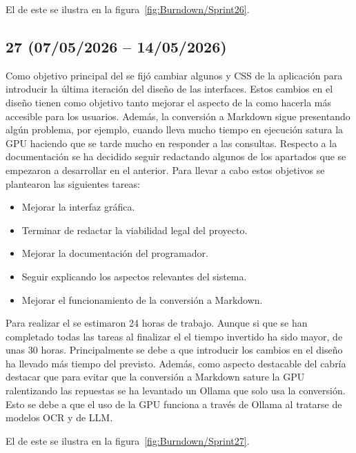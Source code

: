 El  de este  se ilustra en la figura~\ref{fig:Burndown/Sprint26}.

\subsection{ 27 (07/05/2026 -- 14/05/2026)}
Como objetivo principal del  se fijó cambiar algunos  y CSS de la aplicación para introducir la última iteración del diseño de las interfaces. Estos cambios en el diseño tienen como objetivo tanto mejorar el aspecto de la  como hacerla más accesible para los usuarios. Además, la conversión a Markdown sigue presentando algún problema, por ejemplo, cuando lleva mucho tiempo en ejecución satura la GPU haciendo que se tarde mucho en responder a las consultas. Respecto a la documentación se ha decidido seguir redactando algunos de los apartados que se empezaron a desarrollar en el  anterior. Para llevar a cabo estos objetivos se plantearon las siguientes tareas:
\begin{itemize}
\tightlist
	\item Mejorar la interfaz gráfica.
	\item Terminar de redactar la viabilidad legal del proyecto.
	\item Mejorar la documentación del programador.
	\item Seguir explicando los aspectos relevantes del sistema.
	\item Mejorar el funcionamiento de la conversión a Markdown.
\end{itemize}

Para realizar el  se estimaron 24 horas de trabajo. Aunque si que se han completado todas las tareas al finalizar el  el tiempo invertido ha sido mayor, de unas 30 horas. Principalmente se debe a que introducir los cambios en el diseño ha llevado más tiempo del previsto. Además, como aspecto destacable del  cabría destacar que para evitar que la conversión a Markdown sature la GPU ralentizando las repuestas se ha levantado un Ollama que solo usa la conversión. Esto se debe a que el uso de la GPU funciona a través de Ollama al tratarse de modelos OCR y de LLM.

El  de este  se ilustra en la figura~\ref{fig:Burndown/Sprint27}.

